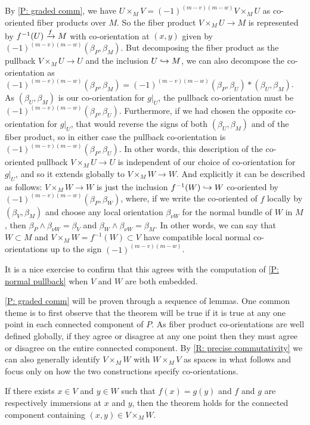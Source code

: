 \begin{example}
	By \cref{P: graded comm}, we have $U\times_MV=(-1)^{(m-v)(m-w)}V\times_MU$ as co-oriented fiber products over $M$.
	So the fiber product $V\times_MU\to M$ is represented by $f^{-1}(U)\xrightarrow{f}M$ with co-orientation at $(x,y)$ given by $(-1)^{(m-v)(m-w)}(\beta_P,\beta_M)$.
	But decomposing the fiber product as the pullback $V\times_M U\to U$ and the inclusion $U\hookrightarrow M$, we can also decompose the co-orientation as $(-1)^{(m-v)(m-w)}(\beta_P,\beta_M)=(-1)^{(m-v)(m-w)}(\beta_P,\beta_U)*(\beta_U,\beta_M)$.
	As $(\beta_U,\beta_M)$ is our co-orientation for $g|_U$, the pullback co-orientation must be $(-1)^{(m-v)(m-w)}(\beta_P,\beta_U)$.
	Furthermore, if we had chosen the opposite co-orientation for $g|_U$, that would reverse the signs of both $(\beta_U,\beta_M)$ and of the fiber product, so in either case the pullback co-orientation is $(-1)^{(m-v)(m-w)}(\beta_P,\beta_U)$.
	In other words, this description of the co-oriented pullback $V\times_MU\to U$ is independent of our choice of co-orientation for $g|_U$, and so it extends globally to $V\times_M W\to W$.
	And explicitly it can be described as follows:
	$V\times_MW\to W$ is just the inclusion $f^{-1}(W)\hookrightarrow W$ co-oriented by $(-1)^{(m-v)(m-w)}(\beta_P,\beta_W)$, where, if we write the co-oriented of $f$ locally by $(\beta_V,\beta_M)$ and choose any local orientation $\beta_{\nu W}$ for the normal bundle of $W$ in $M$, then $\beta_P\wedge \beta_{\nu W}=\beta_V$ and $\beta_W\wedge \beta_{\nu W}=\beta_M$.
	In other words, we can say that $W\subset M$ and $V\times_MW =f^{-1}(W)\subset V$ have compatible local normal co-orientations up to the sign $(-1)^{(m-v)(m-w)}$.

	It is a nice exercise to confirm that this agrees with the computation of \cref{P: normal pullback} when $V$ and $W$ are both embedded.
\end{example}

\cref{P: graded comm} will be proven through a sequence of lemmas.
One common theme is to first observe that the theorem will be true if it is true at any one point in each connected component of $P$.
As fiber product co-orientations are well defined globally, if they agree or disagree at any one point then they must agree or disagree on the entire connected component.
By \cref{R: precise commutativity} we can also generally identify $V\times_M W$ with $W\times_MV$ as spaces in what follows and focus only on how the two constructions specify co-orientations.

\begin{lemma}\label{L: im/im}
	If there exists $x\in V$ and $y\in W$ such that $f(x)=g(y)$ and $f$ and $g$ are respectively immersions at $x$ and $y$, then the theorem holds for the connected component containing $(x,y)\in V\times_MW$.
\end{lemma}

